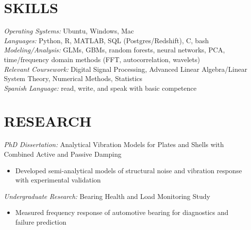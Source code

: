 \documentclass[margin]{res}
\begin{document}
\begin{resume}
 
\section{SKILLS} 
               {\sl Operating Systems:} Ubuntu, Windows, Mac \\ 
               {\sl Languages:} Python, R, MATLAB, SQL (Postgres/Redshift), C, bash\\
               {\sl Modeling/Analysis:} GLMs, GBMs, random forests, neural networks, 
                    PCA, time/frequency domain methods (FFT, autocorrelation, 
                    wavelets) \\
               {\sl Relevant Coursework:} Digital Signal Processing, Advanced Linear 
                    Algebra/Linear System Theory, Numerical Methods, Statistics \\ 
               {\sl Spanish Language:} read, write, and speak with basic competence


\section{RESEARCH}
               {\sl PhD Dissertation:} Analytical Vibration Models for Plates and
                    Shells with Combined Active and Passive Damping
               \begin{itemize}
               \item Developed semi-analytical models of structural noise and
                     vibration response with experimental validation
               \end{itemize}
               {\sl Undergraduate Research:} Bearing Health and Load Monitoring Study
               \begin{itemize}
               \item Measured frequency response of automotive bearing for
                     diagnostics and failure prediction
               \end{itemize}


\end{resume}
\end{document}
